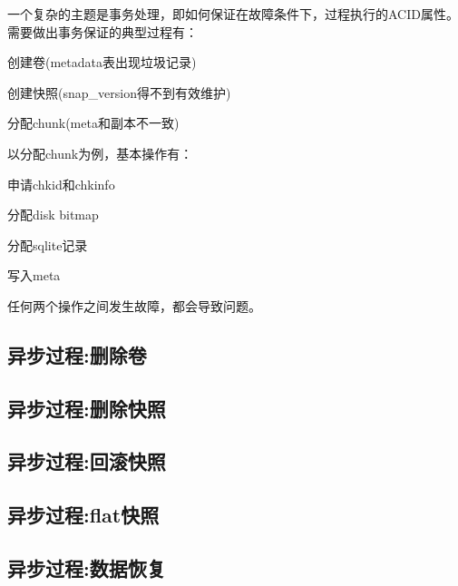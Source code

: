 一个复杂的主题是事务处理，即如何保证在故障条件下，过程执行的ACID属性。
需要做出事务保证的典型过程有：
\begin{compactenum}
\item 创建卷(metadata表出现垃圾记录)
\item 创建快照(snap\_version得不到有效维护)
\item 分配chunk(meta和副本不一致)
\end{compactenum}

以分配chunk为例，基本操作有：
\begin{compactenum}
\item 申请chkid和chkinfo
\item 分配disk bitmap
\item 分配sqlite记录
\item 写入meta
\end{compactenum}

任何两个操作之间发生故障，都会导致问题。

\subsection{异步过程:删除卷}

\subsection{异步过程:删除快照}

\subsection{异步过程:回滚快照}

\subsection{异步过程:flat快照}

\subsection{异步过程:数据恢复}
